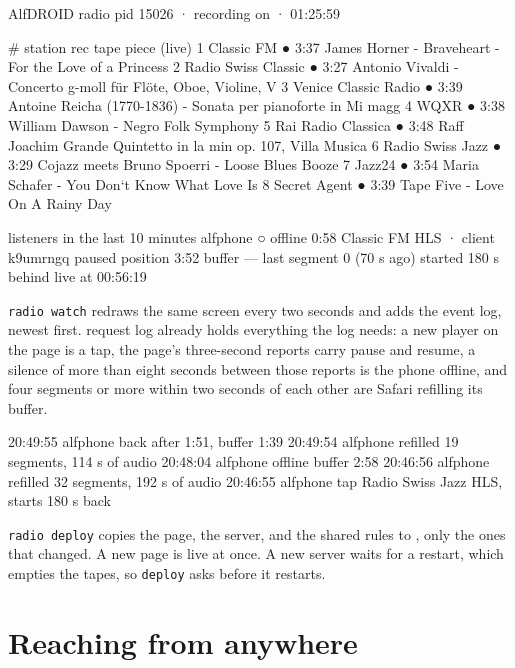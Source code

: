 \documentclass[11pt,a4paper]{article}
\begin{document}
\begin{cmdout}
AlfDROID radio  pid 15026 · recording on · 01:25:59

 # station               rec    tape  piece (live)
 1 Classic FM             ●     3:37  James Horner - Braveheart - For the Love of a Princess
 2 Radio Swiss Classic    ●     3:27  Antonio Vivaldi - Concerto g-moll für Flöte, Oboe, Violine, V
 3 Venice Classic Radio   ●     3:39  Antoine Reicha (1770-1836) - Sonata per pianoforte in Mi magg
 4 WQXR                   ●     3:38  William Dawson - Negro Folk Symphony
 5 Rai Radio Classica     ●     3:48  Raff Joachim Grande Quintetto in la min op. 107, Villa Musica
 6 Radio Swiss Jazz       ●     3:29  Cojazz meets Bruno Spoerri - Loose Blues Booze
 7 Jazz24                 ●     3:54  Maria Schafer - You Don`t Know What Love Is
 8 Secret Agent           ●     3:39  Tape Five - Love On A Rainy Day

listeners in the last 10 minutes
  alfphone  ○ offline 0:58  Classic FM  HLS · client k9umrngq
    paused   position   3:52   buffer —   last segment 0 (70 s ago)
    started 180 s behind live at 00:56:19
\end{cmdout}

\texttt{radio watch} redraws the same screen every two seconds and adds the event log, newest first.  request log already holds everything the log needs: a new player on the page is a tap, the page's three-second reports carry pause and resume, a silence of more than eight seconds between those reports is the phone offline, and four segments or more within two seconds of each other are Safari refilling its buffer.

\begin{cmdout}
20:49:55  alfphone  back  after 1:51, buffer 1:39
20:49:54  alfphone  refilled  19 segments, 114 s of audio
20:48:04  alfphone  offline  buffer 2:58
20:46:56  alfphone  refilled  32 segments, 192 s of audio
20:46:55  alfphone  tap Radio Swiss Jazz  HLS, starts 180 s back
\end{cmdout}

\texttt{radio deploy} copies the page, the server, and the shared rules to , only the ones that changed. A new page is live at once. A new server waits for a restart, which empties the tapes, so \texttt{deploy} asks before it restarts.

\section*{Reaching  from anywhere}
\end{document}
